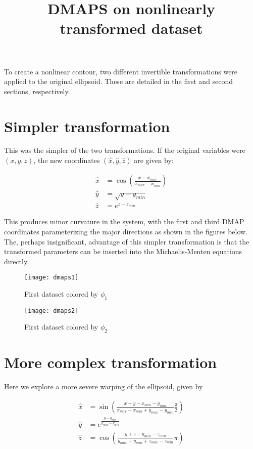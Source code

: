 \documentclass[11pt]{article}
\title{DMAPS on nonlinearly transformed dataset}
\begin{document}
\maketitle

To create a nonlinear contour, two different invertible transformations were applied to the original ellipsoid. These are detailed in the first and second sections, respectively.

\section{Simpler transformation}

This was the simpler of the two transformations. If the original variables were $(x,y,z)$, the new coordinates $(\hat{x}, \hat{y}, \hat{z})$ are given by:

\begin{align*}
  \hat{x} &= \cos(\frac{x - x_{min}}{x_{max} - x_{min}}) \\
  \hat{y} &= \sqrt{y - y_{min}} \\
  \hat{z} &= e^{z - z_{min}}
\end{align*}

This produces minor curvature in the system, with the first and third DMAP coordinates parameterizing the major directions as shown in the figures below. The, perhaps insignificant, advantage of this simpler transformation is that the transformed parameters can be inserted into the Michaelis-Menten equations directly.

\begin{figure}[htbp]
  \centering
  \texttt{[image: dmaps1]}
  \caption{First dataset colored by $\phi_1$}
\end{figure}

\begin{figure}[htbp]
  \centering
  \texttt{[image: dmaps2]}
  \caption{First dataset colored by $\phi_2$}
\end{figure}

\clearpage

\section{More complex transformation}

Here we explore a more severe warping of the ellipsoid, given by

\begin{align*}
  \hat{x} &= \sin(\frac{x + y - x_{min} - y_{min}}{x_{max} - x_{min} + y_{max} - y_{min}}\frac{\pi}{2}) \\
  \hat{y} &= e^{\frac{y - y_{min}}{y_{max}- y_{min}}} \\
  \hat{z} &= \cos(\frac{y + z - y_{min} - z_{min}}{y_{max} - y_{min} + z_{max} - z_{min}}\pi)
\end{align*}
\end{document}
